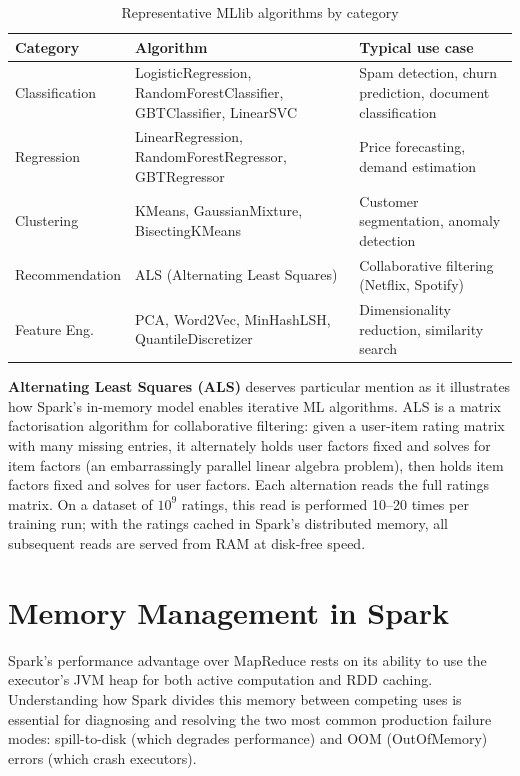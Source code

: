 \begin{table}[h!t]
\centering
\caption{Representative MLlib algorithms by category}
\label{tab:mllib-algos}
\renewcommand{\arraystretch}{1.5}
\begin{tabular}{L{2.4cm} L{3.6cm} L{4.4cm}}
\toprule
\textbf{Category} & \textbf{Algorithm} & \textbf{Typical use case} \\
\midrule
Classification  & LogisticRegression, RandomForestClassifier, GBTClassifier, LinearSVC & Spam detection, churn prediction, document classification \\
Regression      & LinearRegression, RandomForestRegressor, GBTRegressor & Price forecasting, demand estimation \\
Clustering      & KMeans, GaussianMixture, BisectingKMeans & Customer segmentation, anomaly detection \\
Recommendation  & ALS (Alternating Least Squares) & Collaborative filtering (Netflix, Spotify) \\
Feature Eng.    & PCA, Word2Vec, MinHashLSH, QuantileDiscretizer & Dimensionality reduction, similarity search \\
\bottomrule
\end{tabular}
\end{table}

\textbf{Alternating Least Squares (ALS)} deserves particular mention as
it illustrates how Spark's in-memory model enables iterative ML algorithms.
ALS is a matrix factorisation algorithm for collaborative filtering: given
a user-item rating matrix with many missing entries, it alternately holds
user factors fixed and solves for item factors (an embarrassingly parallel
linear algebra problem), then holds item factors fixed and solves for user
factors. Each alternation reads the full ratings matrix. On a dataset of
$10^9$ ratings, this read is performed 10--20 times per training run; with
the ratings cached in Spark's distributed memory, all subsequent reads are
served from RAM at disk-free speed.

\section{Memory Management in Spark}
\label{sec:memory}

Spark's performance advantage over MapReduce rests on its ability to
use the executor's JVM heap for both active computation and RDD caching.
Understanding how Spark divides this memory between competing uses is
essential for diagnosing and resolving the two most common production
failure modes: spill-to-disk (which degrades performance) and OOM
(OutOfMemory) errors (which crash executors).


